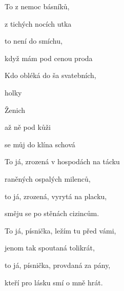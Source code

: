 

\zs
To  z nemoc básníků,

z tichých  nocích utka

to  není  do smíchu,

když mám  pod cenou proda
\ks

\zr
Kdo  obléká do ša svatebních,

holky   

Ženich 

až ně pod kůži 

se můj  do klína schová
\kr

\zs
To já, zrozená v hospodách na tácku

raněných ospalých milenců,

to já, zrozená, vyrytá na placku,

směju se po stěnách cizincům.
\ks

\zr	\kr

\zs
To já, písnička, ležím tu před vámi,

jenom tak spoutaná tolikrát,

to já, písnička, provdaná za pány,

kteří pro lásku smí o mně hrát.
\ks

\zr	\kr
\kp







